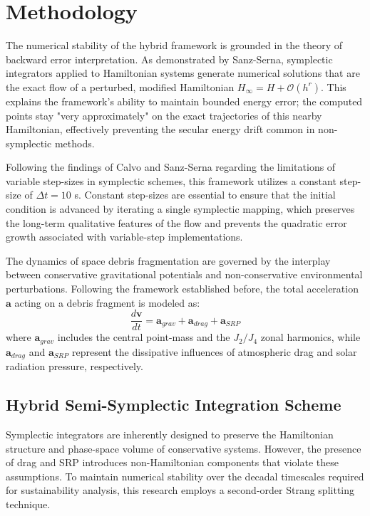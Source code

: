 \documentclass[letterpaper,11pt]{AAS}
\begin{document}
\section{Methodology}

The numerical stability of the hybrid framework is grounded in the theory of backward error interpretation. As demonstrated by Sanz-Serna, symplectic integrators applied to Hamiltonian systems generate numerical solutions that are the exact flow of a perturbed, modified Hamiltonian $H_{\infty} = H + \mathcal{O}(h^r)$. This explains the framework's ability to maintain bounded energy error; the computed points stay "very approximately" on the exact trajectories of this nearby Hamiltonian, effectively preventing the secular energy drift common in non-symplectic methods\cite{sanz-serna_symplectic_1992}.

Following the findings of Calvo and Sanz-Serna regarding the limitations of variable step-sizes in symplectic schemes, this framework utilizes a constant step-size of $\Delta t = 10$ s. Constant step-sizes are essential to ensure that the initial condition is advanced by iterating a single symplectic mapping, which preserves the long-term qualitative features of the flow and prevents the quadratic error growth associated with variable-step implementations\cite{sanz-serna_symplectic_1992}.

The dynamics of space debris fragmentation are governed by the interplay between conservative gravitational potentials and non-conservative environmental perturbations. Following the framework established before, the total acceleration $\mathbf{a}$ acting on a debris fragment is modeled as:
\begin{equation}
    \frac{d\mathbf{v}}{dt} = \mathbf{a}_{grav} + \mathbf{a}_{drag} + \mathbf{a}_{SRP}
\end{equation}
where $\mathbf{a}_{grav}$ includes the central point-mass and the $J_2/J_4$ zonal harmonics, while $\mathbf{a}_{drag}$ and $\mathbf{a}_{SRP}$ represent the dissipative influences of atmospheric drag and solar radiation pressure, respectively.

\subsection{Hybrid Semi-Symplectic Integration Scheme}
Symplectic integrators are inherently designed to preserve the Hamiltonian structure and phase-space volume of conservative systems. However, the presence of drag and SRP introduces non-Hamiltonian components that violate these assumptions. To maintain numerical stability over the decadal timescales required for sustainability analysis, this research employs a second-order Strang splitting technique\cite{puerta-ibarra_advanced_2025}.
\end{document}
